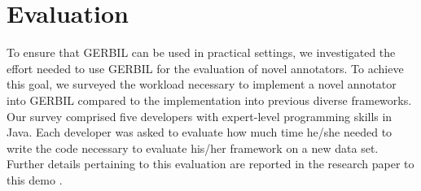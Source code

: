 


\section{Evaluation}
\label{cha333:sec:eval}
To ensure that GERBIL can be used in practical settings, we investigated the effort needed to use GERBIL for the evaluation of novel annotators.
To achieve this goal, we surveyed the workload necessary to implement a novel annotator into GERBIL compared to the implementation into previous diverse frameworks. 
Our survey comprised five developers with expert-level programming skills in Java. Each developer was asked to evaluate how much time he/she needed to write the code necessary to evaluate his/her framework on a new data set.
Further details pertaining to this evaluation are reported in the research paper to this demo \cite{GERBIL}.


